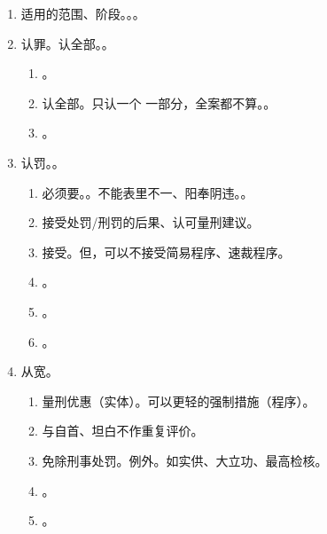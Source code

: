 \begin{enumerate}
        \begin{enumerate}
          \item 适用的范围、阶段。。。
          \item 认罪。认全部。。
                \begin{enumerate}
                  \item {}。
                  \item 认全部。只认一个 \hz 一部分，全案都不算。。
                  \item {}。
                \end{enumerate}
          \item 认罚。。
                \begin{enumerate}
                  \item 必须要。。不能表里不一、阳奉阴违。。
                  \item 接受处罚/刑罚的后果、认可量刑建议。
                  \item 接受。但，可以不接受简易程序、速裁程序。
                  \item {}。
                  \item {}。
                  \item {}。
                \end{enumerate}
          \item 从宽。
                \begin{enumerate}
                  \item \yi 量刑优惠（实体）。\er 可以更轻的强制措施（程序）。
                  \item 与自首、坦白不作重复评价。
                  \item \bdy 免除刑事处罚。例外。如实供、大立功、最高检核。
                  \item {}。
                  \item {}。
                \end{enumerate}

\end{enumerate}
\end{enumerate}
